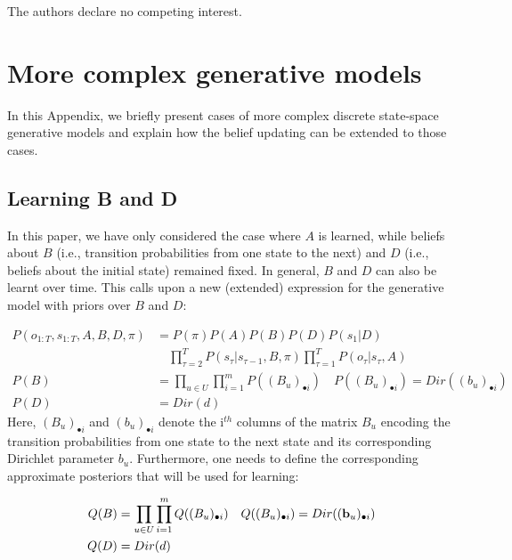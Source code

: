 \documentclass[review,12pt,authoryear]{elsarticle}
\begin{document}
The authors declare no competing interest.

\appendix

\section{More complex generative models}
\label{appendix: more complex models}

In this Appendix, we briefly present cases of more complex discrete state-space generative models and explain how the belief updating can be extended to those cases.

\subsection{Learning B and D}
\label{appendix:learning B D}

In this paper, we have only considered the case where $A$ is learned, while beliefs about $B$ (i.e., transition probabilities from one state to the next) and $D$ (i.e., beliefs about the initial state) remained fixed. In general, $B$ and $D$ can also be learnt over time. This calls upon a new (extended) expression for the generative model with priors over $B$ and $D$:

\begin{equation}
    \label{eq: gen mod with B and D}
    \begin{split}
           P(o_{1:T},s_{1:T},A,B,D,\pi) &=P(\pi) P(A)P(B)P(D)P(s_1|D) \\
           &\quad\prod_{\tau=2}^T P(s_\tau|s_{\tau-1},B, \pi) \prod_{\tau=1}^T  P(o_\tau|s_\tau,A)  \\
           P(B)&=\prod_{u\in U}\prod_{i=1}^m P((B_u)_{\bullet i})\quad P((B_u)_{\bullet i})=Dir((b_u)_{\bullet i})\\
           P(D)&=Dir(d)
    \end{split}
\end{equation}
Here, $(B_u)_{\bullet i}$ and $(b_u)_{\bullet i}$ denote the i$^{th}$ columns of the matrix $B_u$ encoding the transition probabilities from one state to the next state and its corresponding Dirichlet parameter $b_u$. Furthermore, one needs to define the corresponding approximate posteriors that will be used for learning:

\begin{equation}
    \begin{split}
        Q(B)&= \prod_{u\in U}\prod_{i=1}^m Q((B_u)_{\bullet i})\quad Q((B_u)_{\bullet i})=Dir((\bold b_u)_{\bullet i}) \\
        Q(D)&= Dir(d)
    \end{split}
\end{equation}
 
\end{document}
